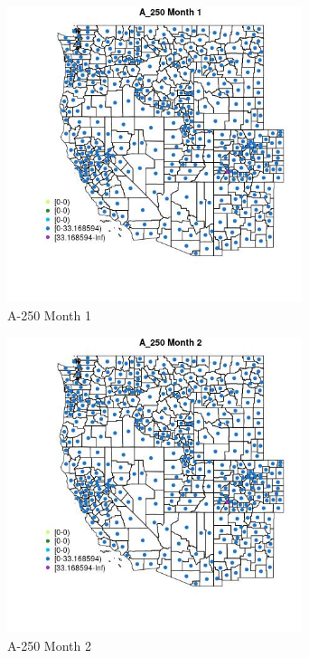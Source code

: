 \begin{figure} 
\centering  
\includegraphics[width=0.77\textwidth]{Code_Outputs/df_report_ML_predictors_CountyCentroid_Locations_Dates_2008-01-01to2018-12-31_MapObsMo1A_250.jpg} 
\caption{\label{fig:df_report_ML_predictors_CountyCentroid_Locations_Dates_2008-01-01to2018-12-31MapObsMo1A_250}A-250 Month 1} 
\end{figure} 
 

\begin{figure} 
\centering  
\includegraphics[width=0.77\textwidth]{Code_Outputs/df_report_ML_predictors_CountyCentroid_Locations_Dates_2008-01-01to2018-12-31_MapObsMo2A_250.jpg} 
\caption{\label{fig:df_report_ML_predictors_CountyCentroid_Locations_Dates_2008-01-01to2018-12-31MapObsMo2A_250}A-250 Month 2} 
\end{figure} 
 

